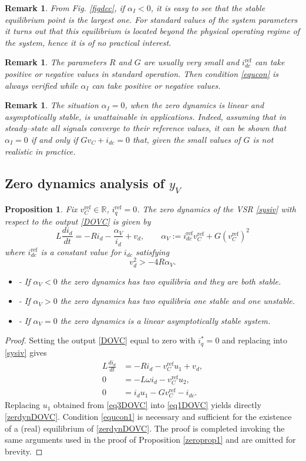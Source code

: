 \documentclass[5p,twocolumn]{elsarticle}
\def\rea{\mathbb{R}}
\def\begequ{\begin{equation}}
\def\endequ{\end{equation}}
\def\lab{\label}
\def\begite{\begin{itemize}}
\def\endite{\end{itemize}}
\def\begrem{\begin{remark}\rm}
\def\endrem{\end{remark}}
\newtheorem{proposition}[theorem]{Proposition}
\newtheorem{remark}[theorem]{Remark}
\numberwithin{equation}{section}
\begin{document}
\begrem
From Fig. \ref{figdcc}, if $\alpha_I<0$, it is easy to see that the stable equilibrium point is the largest one. For standard values of the system parameters it turns out that this equilibrium is located beyond the physical operating regime of the system, hence it is of no practical interest.
\endrem

\begrem
\lab{rem5.6}
The parameters $R$ and $G$ are usually very small and $i_{dc}^\mathrm{ref}$ can take positive or negative values in standard operation. Then condition \eqref{equcon} is always verified while $\alpha_I$ can take positive or negative values.
\endrem

\begrem
\lab{rem5.7}
The situation $\alpha_I=0$, when the zero dynamics is linear and asymptotically stable, is unattainable in applications. Indeed, assuming that in steady--state all signals converge to their reference values, it can be shown that $\alpha_I=0$ if and only if $Gv_C+i_{dc}=0$ that, given the small values of $G$ is not realistic in practice.
\endrem
\subsection{Zero dynamics analysis of $y_V$}
\label{zerdyn2}


\begin{proposition}\em
\label{zeroprop2}
Fix $v_C^{\mathrm{ref}} \in \rea$, $i_q^{\mathrm{ref}}=0$. The zero dynamics of the VSR \eqref{sysiv} with respect to the output \eqref{DOVC} is given by
\begin{equation}
\lab{zerdynDOVC}
L \frac{d i_d}{dt}=-R i_d-\frac{\alpha_V}{i_d} + v_d,\qquad \alpha_V:=i_{dc}^{\mathrm{ref}}v_C^{\mathrm{ref}}+G(v_C^{\mathrm{ref}})^2
\end{equation}
where $i_{dc}^{\mathrm{ref}}$ is a constant value for $i_{dc}$ satisfying
\begequ
\lab{equcon1}
v_d^2>-4 R \alpha_V.
\endequ
\begite
\item[-] If $\alpha_V<0$ the zero dynamics has two equilibria and they are both {\em stable}.
\item[-] If $\alpha_V>0$ the zero dynamics has two equilibria one stable and one {unstable}.
\item[-] If $\alpha_V=0$ the zero dynamics is a linear asymptotically {\em stable} system.
\endite
\end{proposition}
\begin{proof}
Setting the output \eqref{DOVC} equal to zero with $i_q^*=0$ and replacing into \eqref{sysiv} gives
\begin{align}
L \frac{di_d}{dt}&=-Ri_d -v_C^{\mathrm{ref}} u_1 +v_d,\label{eq1DOVC}\\
0&=-L\omega i_d -v_C^{\mathrm{ref}} u_2 ,\label{eq2DOVC}\\
0&=i_d u_1 -Gv_C^{\mathrm{ref}}-i_{dc}\label{eq3DOVC}.
\end{align}
Replacing $u_1$ obtained from \eqref{eq3DOVC} into \eqref{eq1DOVC} yields directly \eqref{zerdynDOVC}. Condition \eqref{equcon1} is necessary and sufficient for the existence of a (real) equilibrium of
\eqref{zerdynDOVC}. The proof is completed invoking the same arguments used in the proof of Proposition \ref{zeroprop1} and are omitted for brevity.
\end{proof}
\end{document}
